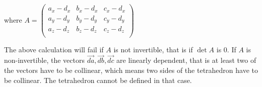 \documentclass{article}
\begin{document}
\begin{flushleft}
where $A = \begin{pmatrix}
	{a_x - d_x} & {b_x - d_x} & {c_x - d_x}\\
	{a_y - d_y} & {b_y - d_y} & {c_y - d_y}\\
	{a_z - d_z} & {b_z - d_z} & {c_z - d_z}\\
\end{pmatrix}$\linebreak
\end{flushleft}
The above calculation will fail if $A$ is not invertible, that is if $\det{A}$ is 0.\linebreak
If $A$ is non-invertible, the vectors $\vec{da}, \vec{db}, \vec{dc}$ are linearly dependent, that is at least two of the vectors have to be collinear, which means two sides of the tetrahedron have to be collinear. The tetrahedron cannot be defined in that case.
\end{document}
